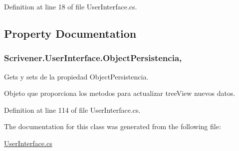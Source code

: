 Definition at line 18 of file User\-Interface.\-cs.



\subsection{Property Documentation}
\hypertarget{class_scrivener_1_1_user_interface_a4029948a0c4bb3d5c6407872ac9ea878}{
\subsubsection[{Object\-Persistencia}]{ Scrivener.\-User\-Interface.\-Object\-Persistencia\hspace{0.3cm}{\ttfamily [get]}, {\ttfamily [set]}}}\label{class_scrivener_1_1_user_interface_a4029948a0c4bb3d5c6407872ac9ea878}


Gets y sets de la propiedad Object\-Persistencia. 

Objeto que proporciona los metodos para actualizar tree\-View nuevos datos. 

Definition at line 114 of file User\-Interface.\-cs.



The documentation for this class was generated from the following file\-:\begin{DoxyCompactItemize}
\item 
\hyperlink{_user_interface_8cs}{User\-Interface.\-cs}\end{DoxyCompactItemize}
